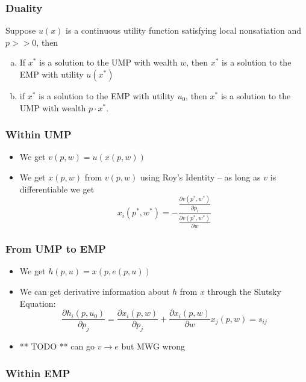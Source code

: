 
\subsubsection{Duality}
\label{sec:duality}

\begin{prop}
  Suppose $u(x)$ is a continuous utility function satisfying local
  nonsatiation and $p >> 0$, then
  \begin{enumerate}[(a)]
  \item If $x^*$ is a solution to the UMP with wealth $w$, then $x^*$
    is a solution to the EMP with utility $u(x^*)$
  \item if $x^*$ is a solution to the EMP with utility $u_0$, then
    $x^*$ is a solution to the UMP with wealth $p \cdot x^*$.
  \end{enumerate}
\end{prop}


\subsubsection{Within UMP}
\label{sec:within-ump}

\begin{itemize}
\item We get $v(p,w) = u(x(p,w))$
\item We get $x(p,w)$ from $v(p,w)$ using Roy's Identity -- as long as
  $v$ is differentiable we get
  \[
  x_i(p^*, w^*)
  = - \frac{
    \frac{\partial v(p^*, w^*)}{\partial p_i}
  } {
    \frac{\partial v(p^*, w^*)}{\partial w}
  }
  \]
\end{itemize}

\subsubsection{From UMP to EMP}
\label{sec:from-ump-emp}

\begin{itemize}
\item We get $h(p, u) = x(p, e(p,u))$
\item We can get derivative information about $h$ from $x$ through the
  Slutsky Equation:
  \[
  \frac{\partial h_i (p, u_0)}{\partial p_j}
  = \frac{\partial x_i(p,w)}{\partial p_j}
  + \frac{\partial x_i(p,w)}{\partial w} x_j(p,w) 
  = s_{ij}
  \]
\item ** TODO ** can go $v \to e$ but MWG wrong
\end{itemize}


\subsubsection{Within EMP}
\label{sec:within-emp}

